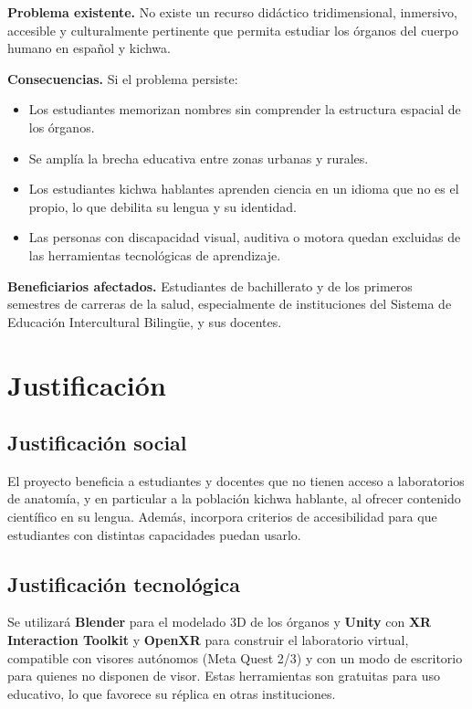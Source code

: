 \documentclass[11pt,a4paper]{article}
\begin{document}
\textbf{Problema existente.} No existe un recurso didáctico tridimensional, inmersivo, accesible y culturalmente pertinente que permita estudiar los órganos del cuerpo humano en español y kichwa.

\textbf{Consecuencias.} Si el problema persiste:
\begin{itemize}
    \item Los estudiantes memorizan nombres sin comprender la estructura espacial de los órganos.
    \item Se amplía la brecha educativa entre zonas urbanas y rurales.
    \item Los estudiantes kichwa hablantes aprenden ciencia en un idioma que no es el propio, lo que debilita su lengua y su identidad.
    \item Las personas con discapacidad visual, auditiva o motora quedan excluidas de las herramientas tecnológicas de aprendizaje.
\end{itemize}

\textbf{Beneficiarios afectados.} Estudiantes de bachillerato y de los primeros semestres de carreras de la salud, especialmente de instituciones del Sistema de Educación Intercultural Bilingüe, y sus docentes.

\section{Justificación}
\subsection*{Justificación social}
El proyecto beneficia a estudiantes y docentes que no tienen acceso a laboratorios de anatomía, y en particular a la población kichwa hablante, al ofrecer contenido científico en su lengua. Además, incorpora criterios de accesibilidad para que estudiantes con distintas capacidades puedan usarlo.

\subsection*{Justificación tecnológica}
Se utilizará \textbf{Blender} para el modelado 3D de los órganos y \textbf{Unity} con \textbf{XR Interaction Toolkit} y \textbf{OpenXR} para construir el laboratorio virtual, compatible con visores autónomos (Meta Quest 2/3) y con un modo de escritorio para quienes no disponen de visor. Estas herramientas son gratuitas para uso educativo, lo que favorece su réplica en otras instituciones.
\end{document}
